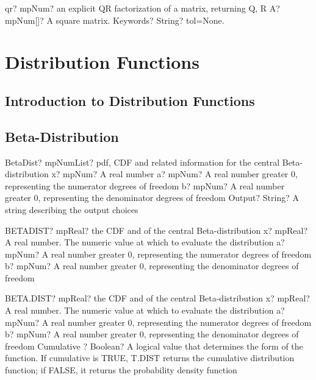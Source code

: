 \documentclass[12pt,a4paper,openany]{book}
\begin{document}
\begin{mpFunctionsExtract}
\mpFunctionTwo
{qr? mpNum? an explicit QR factorization of a matrix, returning Q, R}
{A? mpNum[]? A square matrix.}
{Keywords? String?  tol=None.}
\end{mpFunctionsExtract}

\chapter{Distribution Functions}

\section{Introduction to Distribution Functions}

\section{Beta-Distribution}

\begin{mpFunctionsExtract}
\mpFunctionFourNotImplemented
{BetaDist? mpNumList? pdf, CDF and related information for the central Beta-distribution}
{x? mpNum? A real number}
{a? mpNum? A real number greater 0, representing the numerator  degrees of freedom}
{b? mpNum? A real number greater 0, representing the denominator degrees of freedom}
{Output? String? A string describing the output choices}
\end{mpFunctionsExtract}

\begin{mpFunctionsExtract}
\mpWorksheetFunctionThreeNotImplemented
{BETADIST? mpReal? the CDF and of the central Beta-distribution}
{x? mpReal? A real number. The numeric value at which to evaluate the distribution}
{a? mpNum? A real number greater 0, representing the numerator  degrees of freedom}
{b? mpNum? A real number greater 0, representing the denominator degrees of freedom}
\end{mpFunctionsExtract}

\begin{mpFunctionsExtract}
\mpWorksheetFunctionFourNotImplemented
{BETA.DIST? mpReal? the CDF and of the central Beta-distribution}
{x? mpReal? A real number. The numeric value at which to evaluate the distribution}
{a? mpNum? A real number greater 0, representing the numerator  degrees of freedom}
{b? mpNum? A real number greater 0, representing the denominator degrees of freedom}
{Cumulative ? Boolean? A logical value that determines the form of the function. If cumulative is TRUE, T.DIST returns the cumulative distribution function; if FALSE, it returns the probability density function}
\end{mpFunctionsExtract}
\end{document}
